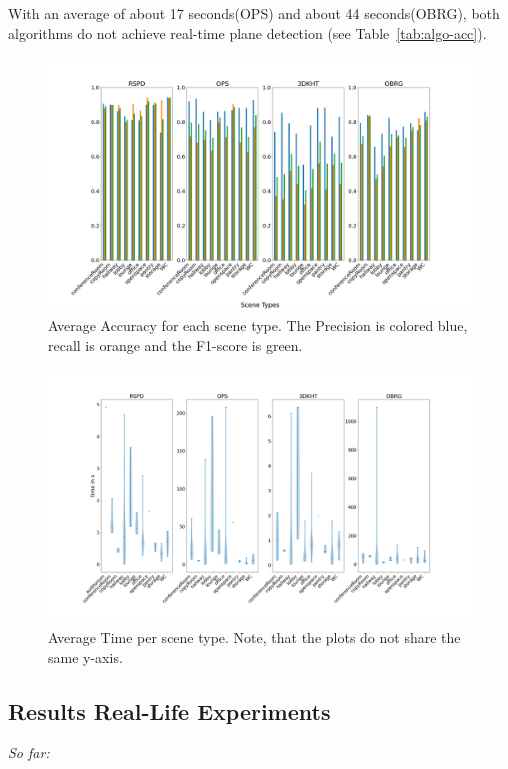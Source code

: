\documentclass[main.tex]{subfiles}
\begin{document}
With an average of about 17 seconds(OPS) and about 44 seconds(OBRG), both algorithms do not achieve real-time plane detection (see Table~\ref{tab:algo-acc}).


\begin{figure}[]
    \centering
    \includegraphics[width=15 cm]{images/accuracy_total.png}
    \caption[Accuracy Results 2D-3D-S]{Average Accuracy for each scene type. The Precision
        is colored blue, recall is orange and the F1-score is green.}
    \label{fig:stanfordaccuracy}
\end{figure}

\begin{figure}[]
    \centering
    \includegraphics[width=15 cm]{images/times_violin.png}
    \caption[Time Results 2D-3D-S]{Average Time per scene type. Note, that the plots
        do not share the same y-axis.}
    \label{fig:violintime}
\end{figure}

\subsection{Results Real-Life Experiments}
\textit{So far:}
\end{document}
